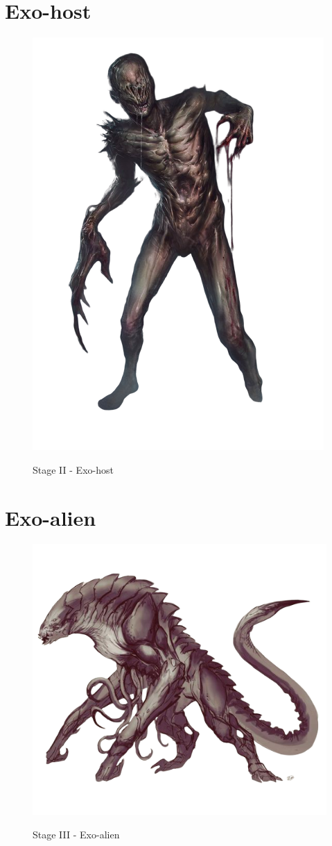 \clearpage

\section{Exo-host}

\begin{figure}
    \centering
    \includegraphics[width=.45\textwidth]{img/stage-II-bg.png}
    \label{fig:stage-2}
    \caption*{Stage II - Exo-host}
\end{figure}


\clearpage

\section{Exo-alien}

\begin{figure}
    \centering
    \includegraphics[width=\textwidth]{img/stage-III-bg.png}
    \label{fig:stage-3}
    \caption*{Stage III - Exo-alien}
\end{figure}